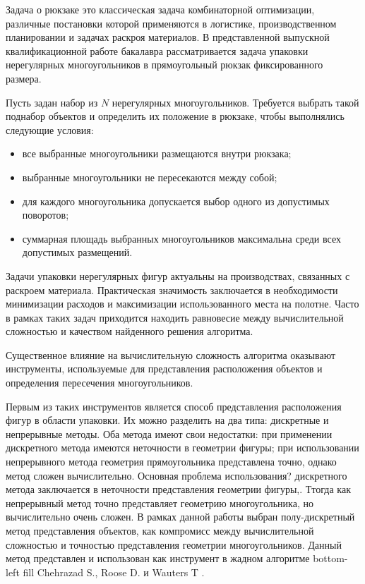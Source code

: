 \documentclass[a4paper]{article}
\begin{document}
    Задача о рюкзаке это классическая задача комбинаторной оптимизации, различные постановки которой применяются в логистике, производственном планировании и задачах раскроя материалов. В представленной выпускной квалификационной работе бакалавра рассматривается задача упаковки нерегулярных многоугольников в прямоугольный рюкзак фиксированного размера.
    
    Пусть задан набор из $N$ нерегулярных многоугольников. Требуется выбрать такой поднабор объектов и определить их положение в рюкзаке, чтобы выполнялись следующие условия:

    \vspace{-0.28cm}
    \begin{itemize}
        \setlength{\itemsep}{0.15em}
        \setlength{\parskip}{0pt}
        \setlength{\parsep}{0pt}

        \item все выбранные многоугольники размещаются внутри рюкзака;
        \item выбранные многоугольники не пересекаются между собой;
        \item для каждого многоугольника допускается выбор одного из допустимых поворотов;
        \item суммарная площадь выбранных многоугольников максимальна среди всех допустимых размещений.
    \end{itemize}
    
    Задачи упаковки нерегулярных фигур актуальны на производствах, связанных с раскроем материала. Практическая значимость заключается в необходимости минимизации расходов и максимизации использованного места на полотне. Часто в рамках таких задач приходится находить равновесие между вычислительной сложностью и качеством найденного решения алгоритма. 

    Существенное влияние на вычислительную сложность алгоритма оказывают инструменты, используемые для представления расположения объектов и определения пересечения многоугольников.

    Первым из таких инструментов является способ представления расположения фигур в области упаковки. Их можно разделить на два типа: дискретные и непрерывные методы. Оба метода имеют свои недостатки: при применении дискретного метода имеются неточности в геометрии фигуры; при использовании непрерывного метода геометрия прямоугольника представлена точно, однако метод сложен вычислительно. Основная проблема использования? дискретного метода заключается в неточности представления геометрии фигуры,. Ттогда как непрерывный метод точно представляет геометрию многоугольника, но вычислительно очень сложен. В рамках данной работы выбран полу-дискретный метод представления объектов, как компромисс между вычислительной сложностью и точностью представления геометрии многоугольников. Данный метод представлен и использован как инструмент в жадном алгоритме bottom-left fill Chehrazad S., Roose D. и Wauters T \cite{BLF semi}. 
\end{document}
